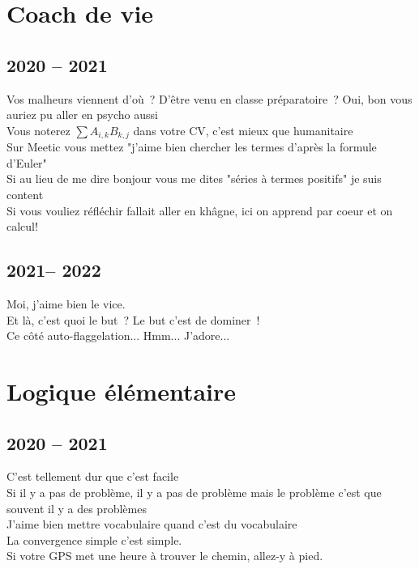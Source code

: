 \documentclass[french, a4paper, openany]{book}
\begin{document}
\section*{Coach de vie}

	\subsection*{2020 -- 2021}

	\noindent \og Vos malheurs viennent d'où~? D'être venu en classe préparatoire~? Oui, bon vous auriez pu aller en psycho aussi \fg \\
	\og Vous noterez $\sum A_{i,k} B_{k,j}$ dans votre CV, c'est mieux que humanitaire \fg \\
	\og Sur Meetic vous mettez "j'aime bien chercher les termes d'après la formule d'Euler" \fg \\
	\og Si au lieu de me dire bonjour vous me dites "séries à termes positifs" je suis content \fg \\
	\og Si vous vouliez réfléchir fallait aller en khâgne, ici on apprend par coeur et on calcul! \fg \\

	\subsection*{2021-- 2022}
	
	\noindent \og Moi, j'aime bien le vice. \fg \\
	\og Et là, c'est quoi le but~? Le but c'est de dominer~! \fg \\
	\og Ce côté auto-flaggelation... Hmm... J'adore... \fg \\

\section*{Logique élémentaire}

	\subsection*{2020 -- 2021}

	\noindent \og C'est tellement dur que c'est facile \fg \\
	\og Si il y a pas de problème, il y a pas de problème mais le problème c'est que souvent il y a des problèmes \fg \\
	\og J'aime bien mettre vocabulaire quand c'est du vocabulaire \fg \\
	\og La convergence simple c'est simple. \fg \\
	\og Si votre GPS met une heure à trouver le chemin, allez-y à pied.\fg \\
\end{document}
